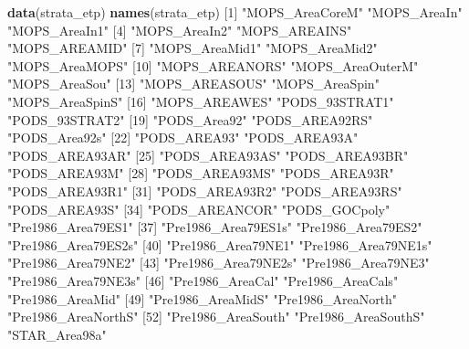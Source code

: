 \documentclass[
]{book}
\newenvironment{Shaded}{\begin{snugshade}}{\end{snugshade}}
\newcommand{\DecValTok}[1]{\textcolor[rgb]{0.00,0.00,0.81}{#1}}
\newcommand{\KeywordTok}[1]{\textcolor[rgb]{0.13,0.29,0.53}{\textbf{#1}}}
\newcommand{\NormalTok}[1]{#1}
\newcommand{\StringTok}[1]{\textcolor[rgb]{0.31,0.60,0.02}{#1}}
\begin{document}
\begin{Shaded}
\begin{Highlighting}[]
\KeywordTok{data}\NormalTok{(strata_etp) }
\KeywordTok{names}\NormalTok{(strata_etp)}
\NormalTok{ [}\DecValTok{1}\NormalTok{] }\StringTok{"MOPS_AreaCoreM"}     \StringTok{"MOPS_AreaIn"}        \StringTok{"MOPS_AreaIn1"}      
\NormalTok{ [}\DecValTok{4}\NormalTok{] }\StringTok{"MOPS_AreaIn2"}       \StringTok{"MOPS_AREAINS"}       \StringTok{"MOPS_AREAMID"}      
\NormalTok{ [}\DecValTok{7}\NormalTok{] }\StringTok{"MOPS_AreaMid1"}      \StringTok{"MOPS_AreaMid2"}      \StringTok{"MOPS_AreaMOPS"}     
\NormalTok{[}\DecValTok{10}\NormalTok{] }\StringTok{"MOPS_AREANORS"}      \StringTok{"MOPS_AreaOuterM"}    \StringTok{"MOPS_AreaSou"}      
\NormalTok{[}\DecValTok{13}\NormalTok{] }\StringTok{"MOPS_AREASOUS"}      \StringTok{"MOPS_AreaSpin"}      \StringTok{"MOPS_AreaSpinS"}    
\NormalTok{[}\DecValTok{16}\NormalTok{] }\StringTok{"MOPS_AREAWES"}       \StringTok{"PODS_93STRAT1"}      \StringTok{"PODS_93STRAT2"}     
\NormalTok{[}\DecValTok{19}\NormalTok{] }\StringTok{"PODS_Area92"}        \StringTok{"PODS_AREA92RS"}      \StringTok{"PODS_Area92s"}      
\NormalTok{[}\DecValTok{22}\NormalTok{] }\StringTok{"PODS_AREA93"}        \StringTok{"PODS_AREA93A"}       \StringTok{"PODS_AREA93AR"}     
\NormalTok{[}\DecValTok{25}\NormalTok{] }\StringTok{"PODS_AREA93AS"}      \StringTok{"PODS_AREA93BR"}      \StringTok{"PODS_AREA93M"}      
\NormalTok{[}\DecValTok{28}\NormalTok{] }\StringTok{"PODS_AREA93MS"}      \StringTok{"PODS_AREA93R"}       \StringTok{"PODS_AREA93R1"}     
\NormalTok{[}\DecValTok{31}\NormalTok{] }\StringTok{"PODS_AREA93R2"}      \StringTok{"PODS_AREA93RS"}      \StringTok{"PODS_AREA93S"}      
\NormalTok{[}\DecValTok{34}\NormalTok{] }\StringTok{"PODS_AREANCOR"}      \StringTok{"PODS_GOCpoly"}       \StringTok{"Pre1986_Area79ES1"} 
\NormalTok{[}\DecValTok{37}\NormalTok{] }\StringTok{"Pre1986_Area79ES1s"} \StringTok{"Pre1986_Area79ES2"}  \StringTok{"Pre1986_Area79ES2s"}
\NormalTok{[}\DecValTok{40}\NormalTok{] }\StringTok{"Pre1986_Area79NE1"}  \StringTok{"Pre1986_Area79NE1s"} \StringTok{"Pre1986_Area79NE2"} 
\NormalTok{[}\DecValTok{43}\NormalTok{] }\StringTok{"Pre1986_Area79NE2s"} \StringTok{"Pre1986_Area79NE3"}  \StringTok{"Pre1986_Area79NE3s"}
\NormalTok{[}\DecValTok{46}\NormalTok{] }\StringTok{"Pre1986_AreaCal"}    \StringTok{"Pre1986_AreaCals"}   \StringTok{"Pre1986_AreaMid"}   
\NormalTok{[}\DecValTok{49}\NormalTok{] }\StringTok{"Pre1986_AreaMidS"}   \StringTok{"Pre1986_AreaNorth"}  \StringTok{"Pre1986_AreaNorthS"}
\NormalTok{[}\DecValTok{52}\NormalTok{] }\StringTok{"Pre1986_AreaSouth"}  \StringTok{"Pre1986_AreaSouthS"} \StringTok{"STAR_Area98a"}      

\end{Highlighting}
\end{Shaded}
\end{document}
